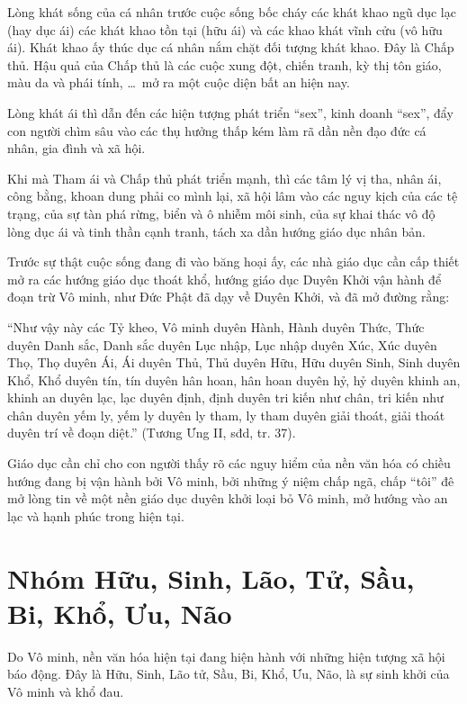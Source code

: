 Lòng khát sống của cá nhân trước cuộc sống bốc cháy các khát khao ngũ dục lạc (hay dục ái) các khát khao tồn tại (hữu ái) và các khao khát vĩnh cửu (vô hữu ái). Khát khao ấy thúc dục cá nhân nắm chặt đối tượng khát khao. Đây là Chấp thủ. Hậu quả của Chấp thủ là các cuộc xung đột, chiến tranh, kỳ thị tôn giáo, màu da và phái tính, \ldots ~mở ra một cuộc diện bất an hiện nay.

Lòng khát ái thì dẫn đến các hiện tượng phát triển ``sex'', kinh doanh ``sex'', đẩy con người chìm sâu vào các thụ hưởng thấp kém làm rã dần nền đạo đức cá nhân, gia đình và xã hội.

Khi mà Tham ái và Chấp thủ phát triển mạnh, thì các tâm lý vị tha, nhân ái, công bằng, khoan dung phải co mình lại, xã hội lâm vào các nguy kịch của các tệ trạng, của sự tàn phá rừng, biển và ô nhiễm môi sinh, của sự khai thác vô độ lòng dục ái và tinh thần cạnh tranh, tách xa dần hướng giáo dục nhân bản.

Trước sự thật cuộc sống đang đi vào băng hoại ấy, các nhà giáo dục cần cấp thiết mở ra các hướng giáo dục thoát khổ, hướng giáo dục Duyên Khởi vận hành để đoạn trừ Vô minh, như Đức Phật đã dạy về Duyên Khởi, và đã mở đường rằng:

``Như vậy này các Tỷ kheo, Vô minh duyên Hành, Hành duyên Thức, Thức duyên Danh sắc, Danh sắc duyên Lục nhập, Lục nhập duyên Xúc, Xúc duyên Thọ, Thọ duyên Ái, Ái duyên Thủ, Thủ duyên Hữu, Hữu duyên Sinh, Sinh duyên Khổ, Khổ duyên tín, tín duyên hân hoan, hân hoan duyên hỷ, hỷ duyên khinh an, khinh an duyên lạc, lạc duyên định, định duyên tri kiến như chân, tri kiến như chân duyên yếm ly, yếm ly duyên ly tham, ly tham duyên giải thoát, giải thoát duyên trí về đoạn diệt.'' (Tương Ưng II, sđd, tr. 37).

Giáo dục cần chỉ cho con người thấy rõ các nguy hiểm của nền văn hóa có chiều hướng đang bị vận hành bởi Vô minh, bởi những ý niệm chấp ngã, chấp ``tôi'' đê mở lòng tin về một nền giáo dục duyên khởi loại bỏ Vô minh, mở hướng vào an lạc và hạnh phúc trong hiện tại.


\section{Nhóm Hữu, Sinh, Lão, Tử, Sầu, Bi, Khổ, Ưu, Não} %
\label{sec:huu_sinh_lao_tu_sau_bi}

Do Vô minh, nền văn hóa hiện tại đang hiện hành với những hiện tượng xã hội báo động. Đây là Hữu, Sinh, Lão tử, Sầu, Bi, Khổ, Ưu, Não, là sự sinh khởi của Vô minh và khổ đau.

